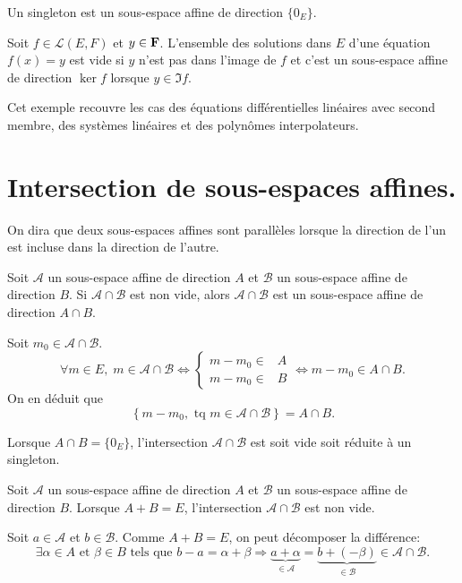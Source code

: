 \begin{rem}
 Un singleton est un sous-espace affine de direction $\{0_E\}$.
\end{rem}
\begin{exple}
 Soit $f\in\mathcal{L}(E,F)$ et $y\in\mathbf{F}$. L'ensemble des solutions dans $E$ d'une équation $f(x) = y$ est vide si $y$ n'est pas dans l'image de $f$ et c'est un sous-espace affine de direction $\ker f$ lorsque $y \in \Im f$. 
\end{exple}
Cet exemple recouvre les cas des équations différentielles linéaires avec second membre, des systèmes linéaires et des polynômes interpolateurs.

\section{Intersection de sous-espaces affines.}
\begin{defi}
 On dira que deux sous-espaces affines sont parallèles lorsque la direction de l'un est incluse dans la direction de l'autre. 
\end{defi}

\begin{propn}\label{sing}
 Soit $\mathcal A$ un sous-espace affine de direction $A$ et $\mathcal B$ un sous-espace affine de direction $B$. Si $\mathcal A\cap \mathcal B$ est non vide, alors $\mathcal A\cap \mathcal B$ est un sous-espace affine de direction $A\cap B$.
\end{propn}
\begin{demo}
Soit $m_0\in \mathcal{A} \cap \mathcal{B}$.
\begin{displaymath}
\forall m \in E,\; m\in \mathcal{A}\cap \mathcal{B}
\Leftrightarrow
\left\lbrace 
\begin{aligned}
  m-m_0 \in& A \\ m-m_0\in& B
\end{aligned}
\right. \Leftrightarrow m-m_0 \in A\cap B .
\end{displaymath}
On en déduit que
\begin{displaymath}
  \left\lbrace m-m_0, \text{ tq } m\in \mathcal{A}\cap \mathcal{B}\right\rbrace = A\cap B .
\end{displaymath}
\end{demo}
\begin{rem}
 Lorsque $A\cap B=\{0_E\}$, l'intersection $\mathcal A \cap \mathcal B$ est soit vide soit réduite à un singleton.
\end{rem}

\begin{propn}\label{somm}
 Soit $\mathcal A$ un sous-espace affine de direction $A$ et $\mathcal B$ un sous-espace affine de direction $B$. Lorsque $A+B=E$, l'intersection $\mathcal A\cap \mathcal B$ est non vide.
\end{propn}
\begin{demo}
Soit $a\in \mathcal{A}$ et $b\in\mathcal{B}$. Comme $A+B=E$, on peut décomposer la différence: 
\[
\exists \alpha\in A \text{ et }\beta\in B \text{ tels que }  b - a = \alpha + \beta \Rightarrow 
 \underset{\in \mathcal{A}}{\underbrace{a + \alpha}} = \underset{\in \mathcal{B}}{\underbrace{b + (-\beta)}} \in \mathcal{A} \cap \mathcal{B}.
\]
\end{demo}

